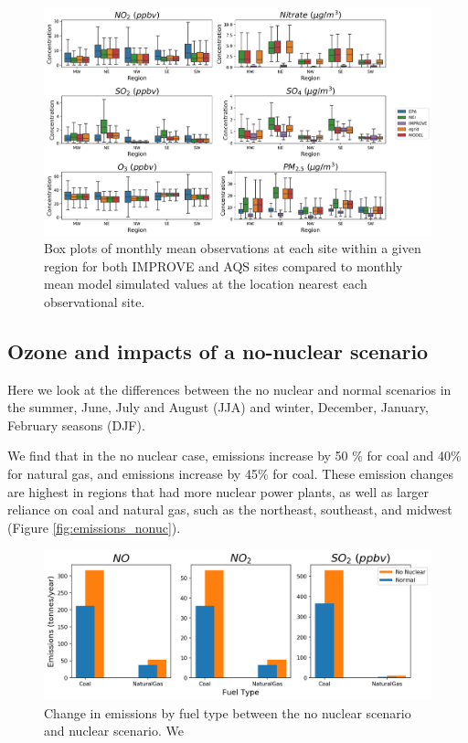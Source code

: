\documentclass[12]{article}
\begin{document}
\begin{figure}
    \centering
    \includegraphics[scale=0.5]{model_validation/Figures/obs_boxplots.png}
    \caption{Box plots of monthly mean observations at each site within a given region for both IMPROVE and AQS sites compared to monthly mean model simulated values at the location nearest each observational site.} 
    \label{fig:obs_model}
\end{figure}


\subsection{Ozone and  impacts of a no-nuclear scenario}
Here we look at the differences between the no nuclear and normal scenarios in the summer, June, July and August (JJA) and winter, December, January, February seasons (DJF). 

We find that in the no nuclear case,  emissions increase by 50 \% for coal and 40\% for natural gas, and  emissions increase by 45\% for coal. These emission changes are highest in regions that had more nuclear power plants, as well as larger reliance on coal and natural gas, such as the northeast, southeast, and midwest (Figure \ref{fig:emissions_nonuc}). 

\begin{figure}
    \centering
    \includegraphics[scale=0.4]{ego_nonuclear_project/Figures/emissions_fueltype.png}
    \caption{Change in emissions by fuel type between the no nuclear scenario and nuclear scenario. We } 
    \label{fig:emissions_comp}
\end{figure}
\end{document}
